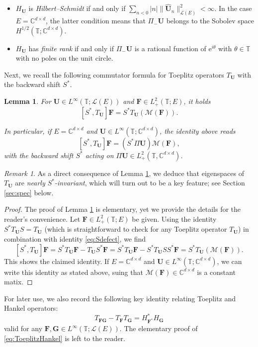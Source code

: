 \documentclass[10pt,reqno,a4paper]{amsart}
\newtheorem{lem}{Lemma}[section]
\theoremstyle{definition}
\theoremstyle{remark}
\theoremstyle{remark}
\newtheorem*{remark*}{Remark}
\numberwithin{equation}{section}
\newcommand{\C}{\mathbb{C}}
\newcommand{\T}{\mathbb{T}}
\newcommand{\Mean}{\mathscr{M}}
\newcommand{\be}{\begin{equation}}
\newcommand{\ee}{\end{equation}}
\newcommand{\eu}{\mathrm{e}}
\newcommand{\Ub}{\mathbf{U}}
\newcommand{\Fb}{\mathbf{F}}
\newcommand{\Gb}{\mathbf{G}}
\newcommand{\Ls}{\mathscr{L}}
\begin{document}
\begin{itemize}
\item $H_\Ub$ is {\em Hilbert--Schmidt} if and only if $\sum_{n <0} |n| \| \widehat{\Ub}_n \|^2_{\Ls(E)} < \infty$. In the case $E=\C^{d \times d}$, the latter condition means that $\Pi_- \Ub$ belongs to the Sobolev space $H^{1/2}(\T; \C^{d \times d})$.
\item $H_\Ub$ has {\em finite rank} if and only if $\Pi_- \Ub$ is a rational function of $\eu^{i \theta}$ with $\theta \in \T$ with no poles on the unit circle.
\end{itemize}



Next, we recall the following commutator formula for Toeplitz operators $T_\Ub$ with the backward shift $S^*$. 

\begin{lem} \label{lem:commutator}
For $\Ub \in L^\infty(\T; \Ls(E))$ and $\Fb \in L^2_+(\T;E)$, it holds
$$
[S^*, T_\Ub] \Fb = S^* T_{\Ub}(\Mean(\Fb)).
$$

In particular, if  $E=\C^{d \times d}$ and $\Ub \in L^\infty(\T; \C^{d \times d})$, the identity above reads
$$
[S^*, T_\Ub] \Fb = (S^* \Pi \Ub)\Mean(\Fb),
$$
with the backward shift $S^*$ acting on $\Pi \Ub \in L^2_+(\T, \C^{d \times d})$.
\end{lem}

\begin{remark*}
 As a direct consequence of Lemma \ref{lem:commutator}, we deduce that eigenspaces of $T_\Ub$ are {\em nearly $S^*$-invariant}, which will turn out to be a key feature; see Section \ref{sec:spec} below.
\end{remark*}

\begin{proof}
The proof of Lemma \ref{lem:commutator} is elementary, yet we provide the details for the reader's convenience. Let $\Fb \in L^2_+(\T;E)$ be given. Using the identity $S^* T_\Ub S = T_\Ub$ (which is straightforward to check for any Toeplitz operator $T_\Ub$) in combination with identity \eqref{eq:Sdefect}, we find
$$
[S^*, T_{\Ub}] \Fb  =  S^* T_\Ub \Fb - T_\Ub S^* \Fb = S^*T_\Ub \Fb- S^* T_{\Ub} S S^* \Fb = S^*T_{\Ub}(\Mean(\Fb)).
$$
This shows the claimed identity. If $E=\C^{d \times d}$ and $\Ub \in L^\infty(\T; \C^{d \times d})$, we can write this identity as stated above, suing that $\Mean(\Fb) \in \C^{d \times d}$ is a constant matix.
\end{proof}

For later use, we also record the following key identity relating Toeplitz and Hankel operators:
\be \label{eq:ToeplitzHankel}
T_{\Fb \Gb} - T_{\Fb} T_{\Gb} = H^*_{\Fb^*} H_{\Gb}
\ee
valid for any $\Fb, \Gb \in L^\infty(\T; \Ls(E))$. The elementary proof of \eqref{eq:ToeplitzHankel} is left to the reader.
\end{document}
